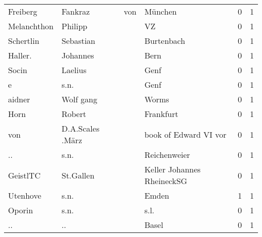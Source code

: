 \begin{center}
\begin{tiny}
\begin{longtabu}{llllrr}
                 Freiberg &                            Fankraz &         von &                                     München &          0 &         1 \\
              Melanchthon &                            Philipp &             &                                          VZ &          0 &         1 \\
                Schertlin &                          Sebastian &             &                                  Burtenbach &          0 &         1 \\
                  Haller. &                           Johannes &             &                                        Bern &          0 &         1 \\
                    Socin &                            Laelius &             &                                        Genf &          0 &         1 \\
                        e &                               s.n. &             &                                        Genf &          0 &         1 \\
                   aidner &                          Wolf gang &             &                                       Worms &          0 &         1 \\
                     Horn &                             Robert &             &                                   Frankfurt &          0 &         1 \\
                      von &                   D.A.Scales .März &             &                       book of Edward VI vor &          0 &         1 \\
                       .. &                               s.n. &             &                                Reichenweier &          0 &         1 \\
                 GeistlTC &                          St.Gallen &             &                  Keller Johannes RheineckSG &          0 &         1 \\
                 Utenhove &                               s.n. &             &                                       Emden &          1 &         1 \\
                   Oporin &                               s.n. &             &                                        s.l. &          0 &         1 \\
                       .. &                                 .. &             &                                       Basel &          0 &         1 \\

\end{longtabu}
\end{tiny}
\end{center}
